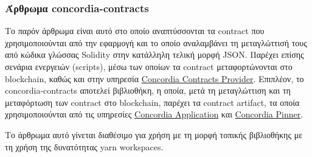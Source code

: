 \subsubsection{Άρθρωμα concordia-contracts} \label{subsubsection:4-3-1-2-concordia-contracts-module}

Το παρόν άρθρωμα είναι αυτό στο οποίο αναπτύσσονται τα contract που χρησιμοποιούνται από την εφαρμογή και το οποίο αναλαμβάνει τη μεταγλώττισή τους από κώδικα γλώσσας Solidity στην κατάλληλη τελική μορφή JSON. Παρέχει επίσης σενάρια ενεργειών (scripts), μέσω των οποίων τα contract μεταφορτώνονται στο blockchain, καθώς και στην υπηρεσία \hyperref[subsection:4-3-5-concordia-contracts-provider-service]{Concordia Contracts Provider}. Επιπλέον, το concordia-contracts αποτελεί βιβλιοθήκη, η οποία, μετά τη μεταγλώττιση και τη μεταφόρτωση των contract στο blockchain, παρέχει τα contract artifact, τα οποία χρησιμοποιούνται από τις υπηρεσίες \hyperref[subsection:4-3-2-concordia-application-service]{Concordia Application} και \hyperref[subsection:4-3-4-concordia-pinner-service]{Concordia Pinner}.

Το άρθρωμα αυτό γίνεται διαθέσιμο για χρήση με τη μορφή τοπικής βιβλιοθήκης με τη χρήση της δυνατότητας yarn workspaces.